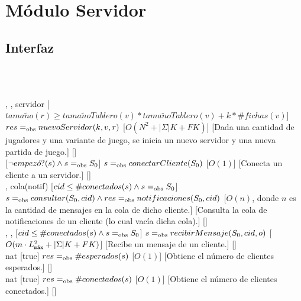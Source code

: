 \section{Módulo Servidor}
\begin{interfaz}{\subsection{Interfaz}}
  \\\\
  \usa{\falta}\par\noindent
  \begin{operaciones}
    {, , }{servidor}
    [$tama\tilde{n}o(r)\geq tama\tilde{n}oTablero(v)*tama\tilde{n}oTablero(v)+k*\#fichas(v)$]
    {$res \igobs nuevoServidor(k,v,r)$}
    [$O(N^{2}+|\Sigma|K+FK)$]
    [Dada una cantidad de jugadores y una variante de juego, se inicia un nuevo servidor y una nueva partida de juego.]
    [\falta]\\

    \noindent{}
    {}{}
    [$\lnot empez\acute{o}?(s) \land s\igobs S_{0}$]
    {$s\igobs conectarCliente(S_{0})$}
    [$O(1)$]
    [Conecta un cliente a un servidor.]
    [\falta]\\

    \noindent{}
    {, }{cola(notif)}
    [$cid\leq \#conectados(s) \land s\igobs S_{0}$]
    {$s\igobs consultar(S_{0},cid)\land res\igobs notificaciones(S_{0},cid)$}
    [$O(n)$, donde $n$ es la cantidad de mensajes en la cola de dicho cliente.]
    [Consulta la cola de notificaciones de un cliente (lo cual vacía dicha cola).]
    [\falta]\\

    \noindent{}
    {, , }{}
    [$cid\leq \#conectados(s) \land s\igobs S_{0}$]
    {$s\igobs recibirMensaje(S_{0},cid,o)$}
    [$O(m\cdot\Lmax^{2}+|\Sigma|K+FK)$]
    [Recibe un mensaje de un cliente.]
    [\falta]\\

    \noindent{}
    {}{nat}
    [true]
    {$res\igobs \#esperados(s)$}
    [$O(1)$]
    [Obtiene el número de clientes esperados.]
    [\falta]\\

    \noindent{}
    {}{nat}
    [true]
    {$res\igobs \#conectados(s)$}
    [$O(1)$]
    [Obtiene el número de clientes conectados.]
    [\falta]\\


\end{operaciones}
\end{interfaz}
